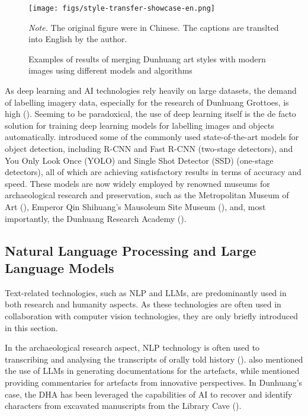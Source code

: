 \begin{figure}
    \caption{Examples of results of merging Dunhuang art styles with modern images using different 
    models and algorithms}
    \label{fig:style-transfer-showcase}
    
    \begin{center}
        \texttt{[image: figs/style-transfer-showcase-en.png]}
    \end{center}

    \small\textit{Note.} The original figure were in Chinese. The captions are translted into English
    by the author. 
\end{figure}

As deep learning and AI technologies rely heavily on large datasets, the demand of labelling imagery data,
especially for the research of Dunhuang Grottoes, is high ().
Seeming to be paradoxical, the use of deep learning itself is the de facto solution for training deep learning
models for labelling images and objects automatically. 
introduced some of the commonly used state-of-the-art models for object detection, including R-CNN and Fast R-CNN
(two-stage detectors), and You Only Look Once (YOLO) and Single Shot Detector (SSD) (one-stage detectors),
all of which are achieving satisfactory results in terms of accuracy and speed.
These models are now widely employed by renowned museums for archaeological research and preservation, such
as the Metropolitan Museum of Art (),
Emperor Qin Shihuang's Mausoleum Site Museum (),
and, most importantly, the Dunhuang Research Academy ().

\subsection{Natural Language Processing and Large Language Models}

Text-related technologies, such as NLP and LLMs, are predominantly used in both research and humanity aspects.
As these technologies are often used in collaboration with computer vision technologies, they are only briefly
introduced in this section.

In the archaeological research aspect, NLP technology is often used to transcribing and analysing the transcripts
of orally told history ().
 also mentioned the use of LLMs in generating documentations
for the artefacts, while  mentioned
providing commentaries for artefacts from innovative perspectives. In Dunhuang's case, the DHA has been leveraged
the capabilities of AI to recover and identify characters from excavated manuscripts from the Library Cave
().

